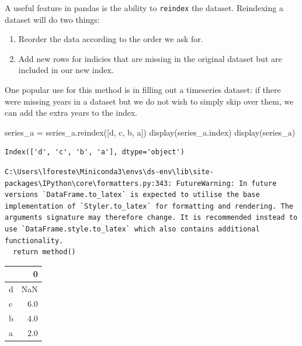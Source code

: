 \documentclass[
  letterpaper,
  DIV=11,
  numbers=noendperiod]{scrreprt}
\newenvironment{Shaded}{\begin{snugshade}}{\end{snugshade}}
\newcommand{\NormalTok}[1]{\textcolor[rgb]{0.00,0.23,0.31}{#1}}
\newcommand{\OperatorTok}[1]{\textcolor[rgb]{0.37,0.37,0.37}{#1}}
\newcommand{\StringTok}[1]{\textcolor[rgb]{0.13,0.47,0.30}{#1}}
\providecommand{\tightlist}{%
  \setlength{\itemsep}{0pt}\setlength{\parskip}{0pt}}\usepackage{longtable,booktabs,array}
\begin{document}
A useful feature in pandas is the ability to \texttt{reindex} the
dataset. Reindexing a dataset will do two things:

\begin{enumerate}
\def\labelenumi{\arabic{enumi}.}
\tightlist
\item
  Reorder the data according to the order we ask for.
\item
  Add new rows for indicies that are missing in the original dataset but
  are included in our new index.
\end{enumerate}

One popular use for this method is in filling out a timeseries dataset:
if there were missing years in a dataset but we do not wish to simply
skip over them, we can add the extra years to the index.

\begin{Shaded}
\begin{Highlighting}[]
\NormalTok{series\_a }\OperatorTok{=}\NormalTok{ series\_a.reindex([}\StringTok{\textquotesingle{}d\textquotesingle{}}\NormalTok{, }\StringTok{\textquotesingle{}c\textquotesingle{}}\NormalTok{, }\StringTok{\textquotesingle{}b\textquotesingle{}}\NormalTok{, }\StringTok{\textquotesingle{}a\textquotesingle{}}\NormalTok{])}
\NormalTok{display(series\_a.index)}
\NormalTok{display(series\_a)}
\end{Highlighting}
\end{Shaded}

\begin{verbatim}
Index(['d', 'c', 'b', 'a'], dtype='object')
\end{verbatim}

\begin{verbatim}
C:\Users\lforeste\Miniconda3\envs\ds-env\lib\site-packages\IPython\core\formatters.py:343: FutureWarning: In future versions `DataFrame.to_latex` is expected to utilise the base implementation of `Styler.to_latex` for formatting and rendering. The arguments signature may therefore change. It is recommended instead to use `DataFrame.style.to_latex` which also contains additional functionality.
  return method()
\end{verbatim}

\begin{tabular}{lr}
\toprule
{} &    0 \\
\midrule
d &  NaN \\
c &  6.0 \\
b &  4.0 \\
a &  2.0 \\
\bottomrule
\end{tabular}
\end{document}
